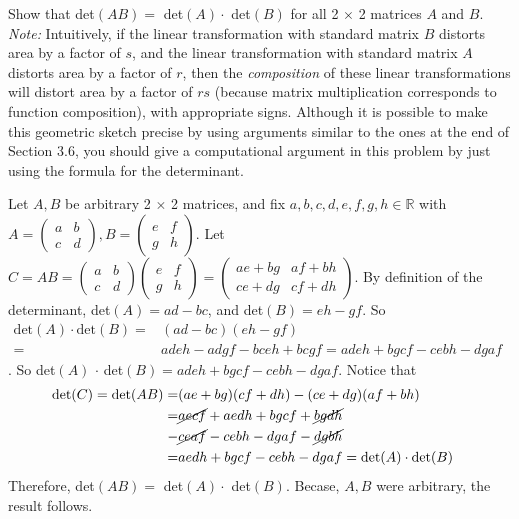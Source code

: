 \documentclass[12pt]{article}
\newenvironment{problem}[2][Problem]
{
	\begin{trivlist} 
		\item[\hskip \labelsep {\bfseries #1 #2:}]
	}
{
	\end{trivlist}
	}
\newenvironment{solution}[1][Solution]
{
	\begin{trivlist} 
		\item[\hskip \labelsep {\itshape #1:}]
	}
	{
	\end{trivlist}
}
\begin{document}
\newpage
\begin{problem}{3}
Show that det$(AB)=$ det$(A) \cdot$ det$(B)$ for all 2 $\times$ 2 matrices $A$ and $B$.
\noindent
{\it Note:} Intuitively, if the linear transformation with standard matrix $B$ distorts area by a factor of $s$, and the linear transformation with standard matrix $A$ distorts area by a factor of $r$, then the {\it composition} of these linear transformations will distort area by a factor of $rs$ (because matrix multiplication corresponds to function composition), with appropriate signs. Although it is possible to make this geometric sketch precise by using arguments similar to the ones at the end of Section 3.6, you should give a computational argument in this problem by just using the formula for the determinant.
\noindent
\newline
\newline
\begin{solution}
Let $A,B$ be arbitrary 2 $\times$ 2 matrices, and fix $a,b,c,d,e,f,g,h \in \mathbb{R}$ with $A=\begin{pmatrix}a&b\\c&d\end{pmatrix}, B=\begin{pmatrix}e&f\\g&h\end{pmatrix}$. Let $C=AB=\begin{pmatrix}a&b\\c&d\end{pmatrix}\begin{pmatrix}e&f\\g&h\end{pmatrix} = \begin{pmatrix}ae+bg&af+bh\\ce+dg&cf+dh\end{pmatrix}$. By definition of the determinant, det$(A) = ad-bc$, and det$(B)=eh-gf$. So
\begin{align*}
\text{det}(A)\cdot \text{det}(B)=&(ad-bc)(eh-gf) &\\
=& adeh-adgf-bceh+bcgf = adeh +bgcf -cebh-dgaf &
\end{align*}.
So det$(A)$ $\cdot$ det$(B)= adeh +bgcf -cebh-dgaf$. Notice that
\begin{align*}
\text{det}(C)= \text{det}(AB) =& (ae+bg)(cf+dh)-(ce+dg)(af+bh) &\\
=& \cancel{aecf}+aedh+bgcf+\cancel{bgdh} &\\
-&\cancel{ceaf}-cebh-dgaf-\cancel{dgbh} &\\
=&aedh+bgcf-cebh-dgaf =\text{det}(A)\cdot \text{det}(B)&\\
\end{align*}
Therefore, det$(AB)=$ det$(A) \cdot$ det$(B)$. Becase, $A,B$ were arbitrary, the result follows.
\end{solution}
\end{problem}
\end{document}
